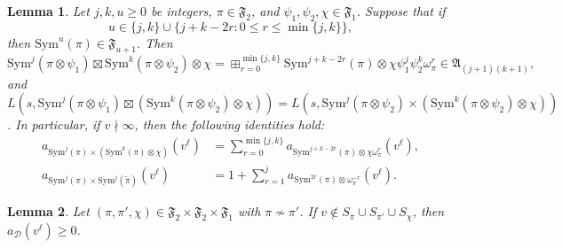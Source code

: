\documentclass[10pt,a4paper]{amsart}
\newtheorem{lemma}{Lemma}
\begin{document}
\begin{lemma}
\label{lem:CG}
Let $j,k,u\geq 0$ be integers, $\pi\in\mathfrak{F}_{2}$, and $\psi_1,\psi_2,\chi\in\mathfrak{F}_{1}$.  Suppose that if
\[
u\in\{j,k\}\cup\{j+k-2r\colon 0\leq r\leq \min\{j,k\}\},
\]
then $\mathrm{Sym}^u(\pi)\in\mathfrak{F}_{u+1}$.  Then
\[
\mathrm{Sym}^{j}(\pi\otimes\psi_1)\boxtimes\mathrm{Sym}^k(\pi\otimes\psi_2)\otimes\chi=\mathop{\boxplus}_{r=0}^{\min\{j,k\}}\mathrm{Sym}^{j+k-2r}(\pi)\otimes\chi\psi_1^j \psi_2^k\omega_{\pi}^{r}\in\mathfrak{A}_{(j+1)(k+1)},
\]
and $L(s,\mathrm{Sym}^{j}(\pi\otimes\psi_1)\boxtimes(\mathrm{Sym}^k(\pi\otimes\psi_2)\otimes\chi))=L(s,\mathrm{Sym}^{j}(\pi\otimes\psi_2)\times(\mathrm{Sym}^k(\pi\otimes\psi_2)\otimes\chi))$. In particular, if $v\nmid\infty$, then the following identities hold:
\begin{align}
a_{\mathrm{Sym}^{j}(\pi)\times(\mathrm{Sym}^k(\pi)\otimes\chi)}(v^{\ell}) &= \sum_{r=0}^{\min\{j,k\}}a_{\mathrm{Sym}^{j+k-2r}(\pi)\otimes\chi \omega_{\pi}^{r}}(v^{\ell}),\label{eqn:CG1}\\
a_{\mathrm{Sym}^{j}(\pi)\times\mathrm{Sym}^j(\widetilde{\pi})}(v^{\ell})&=1+\sum_{r=1}^j a_{\mathrm{Sym}^{2r}(\pi)\otimes\omega_{\pi}^{-r}}(v^{\ell}).\label{eqn:CG2}
\end{align}
\end{lemma}

\begin{lemma}
	\label{lem:coeff}
Let $(\pi,\pi',\chi)\in\mathfrak{F}_2\times\mathfrak{F}_2\times\mathfrak{F}_1$ with $\pi\not\sim\pi'$.  If $v\notin S_{\pi}\cup S_{\pi'}\cup S_{\chi}$, then $a_{\mathcal{D}}(v^{\ell})\geq 0$.
\end{lemma}
\end{document}
